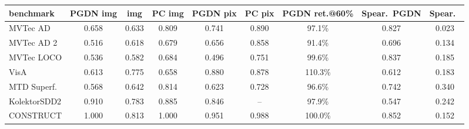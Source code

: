\setlength{\tabcolsep}{3pt}
\begin{tabular}{@{}lcccccccc@{}}
\toprule
benchmark & PGDN img & \draem{} img & PC img & PGDN pix & PC pix & PGDN ret.@60\% & Spear.\ PGDN & Spear.\ \draem{} \\
\midrule
MVTec AD & 0.658 & 0.633 & 0.809 & 0.741 & 0.890 & 97.1\% & 0.827 & 0.023 \\
MVTec AD 2 & 0.516 & 0.618 & 0.679 & 0.656 & 0.858 & 91.4\% & 0.696 & 0.134 \\
MVTec LOCO & 0.536 & 0.582 & 0.684 & 0.496 & 0.751 & 99.6\% & 0.837 & 0.185 \\
VisA & 0.613 & 0.775 & 0.658 & 0.880 & 0.878 & 110.3\% & 0.612 & 0.183 \\
MTD Superf. & 0.568 & 0.642 & 0.814 & 0.623 & 0.728 & 96.6\% & 0.742 & 0.340 \\
KolektorSDD2 & 0.910 & 0.783 & 0.885 & 0.846 & -- & 97.9\% & 0.547 & 0.242 \\
CONSTRUCT & 1.000 & 0.813 & 1.000 & 0.951 & 0.988 & 100.0\% & 0.852 & 0.152 \\
\bottomrule
\end{tabular}
